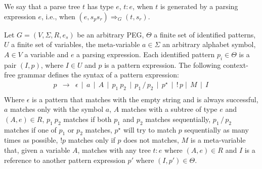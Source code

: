 \begin{definition}
    We say that a parse tree \(t\) has type \(e\), \(t : e\), when \(t\) is generated 
    by a parsing expression \(e\), i.e., when \((e, s_ps_r) \Rightarrow_G (t, s_r)\).
\end{definition}




Let \(G = (V, \Sigma, R, e_s)\) be an arbitrary PEG, \(\Theta\) a finite set
of identified patterns, \(U\) a finite set of variables, the meta-variable 
\(a \in \Sigma\) an arbitrary alphabet symbol, \(A \in V\) a variable and 
\(e\) a parsing expression.
Each identified pattern \(p_i \in \Theta\) is a pair \((I, p)\), where \(I \in U\)
and \(p\) is a pattern expression.
The following context-free grammar defines the syntax of a pattern expression:
\[
   \begin{array}{lcl}
      p & \to & \epsilon \, \mid \, a \, \mid \, A\, \mid \,p_1\:p_2\,
                \mid\,p_1\,/\,p_2\, \mid \,p^\star\, \mid \,!\,p 
                \mid \, M\, \mid \, I\,\\
   \end{array}
\]
Where \(\epsilon\) is a pattern that matches with the empty string and is always
successful, \(a\) matches only with the symbol \(a\), \(A\) matches with a subtree
of type \(e\) and \((A, e) \in R\), \(p_1\:p_2\) matches if both \(p_1\) and \(p_2\)
matches sequentially, \(p_1\,/\,p_2\) matches if one of \(p_1\) or \(p_2\) matches,
\(p^\star\) will try to match \(p\) sequentially as many times as possible, \(!p\)
matches only if \(p\) does not matches, \(M\) is a meta-variable that, given a variable
\(A\), matches with any tree \(t : e\) where \((A, e) \in R\) and \(I\) is a reference
to another pattern expression \(p'\) where \((I, p') \in \Theta\).

